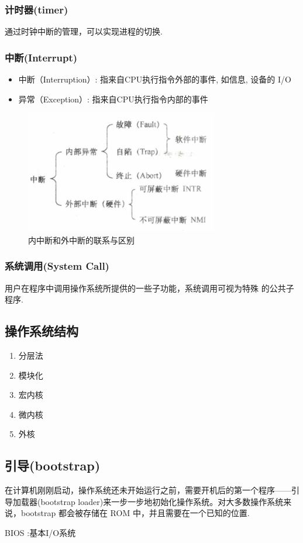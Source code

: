 \subsubsection{计时器(timer)}
通过时钟中断的管理，可以实现进程的切换. 

\subsubsection{中断(Interrupt)}
\begin{itemize}
    \item 中断（Interruption）: 指来自CPU执行指令外部的事件, 如信息, 设备的 I/O
    \item 异常（Exception）: 指来自CPU执行指令内部的事件
\end{itemize}

\begin{figure}[H]
    \centering
    \includegraphics[width=0.618\linewidth]{pic/OS-CheatSheet1/内中断和外中断的联系与区别}
    \caption{内中断和外中断的联系与区别}
\end{figure}


\subsubsection{系统调用(System Call)}
用户在程序中调用操作系统所提供的一些子功能，系统调用可视为特殊
的公共子程序. 

\subsection{操作系统结构}
\begin{enumerate}
    \item 分层法
    \item 模块化
    \item 宏内核
    \item 微内核
    \item 外核
\end{enumerate}

\subsection{引导(bootstrap)}
在计算机刚刚启动，操作系统还未开始运行之前，需要开机后的第一个程序——引导加载器(bootstrap loader)来一步一步地初始化操作系统。对大多数操作系统来说，bootstrap 都会被存储在 ROM 中，并且需要在一个已知的位置. 

BIOS :基本I/O系统